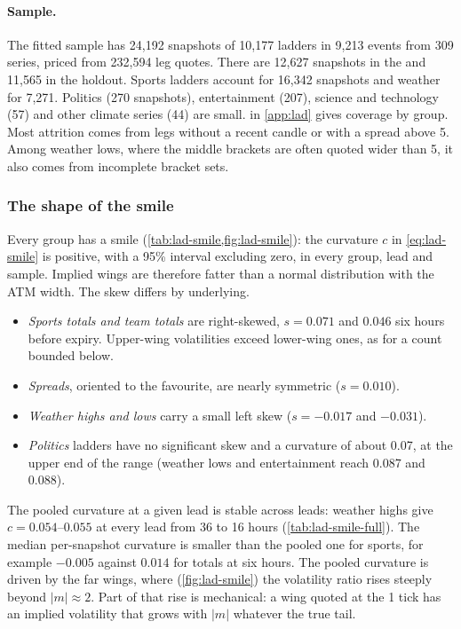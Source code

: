 
\paragraph{Sample.}
The fitted sample has 24,192 snapshots of 10,177 ladders in 9,213 events from 309 series, priced
from 232,594 leg quotes. There are 12,627 snapshots in the \estim{} and 11,565 in the holdout.
Sports ladders account for 16,342 snapshots and weather for 7,271. Politics (270 snapshots),
entertainment (207), science and technology (57) and other climate series (44) are small.
 in \cref{app:lad} gives coverage by group. Most attrition comes from legs
without a recent candle or with a spread above 5\cents. Among weather lows, where the middle
brackets are often quoted wider than 5\cents, it also comes from incomplete bracket sets.

\subsubsection{The shape of the smile}

Every group has a smile (\cref{tab:lad-smile,fig:lad-smile}): the curvature $c$ in
\eqref{eq:lad-smile} is positive, with a 95\% interval excluding zero, in every group, lead and
sample. Implied wings are therefore fatter than a normal distribution with
the ATM width. The skew differs by underlying.
\begin{itemize}
\item \emph{Sports totals and team totals} are right-skewed, $s=0.071$ and $0.046$ six hours
  before expiry. Upper-wing volatilities exceed lower-wing ones, as for a count bounded below.
\item \emph{Spreads}, oriented to the favourite, are nearly symmetric ($s=0.010$).
\item \emph{Weather highs and lows} carry a small left skew ($s=-0.017$ and $-0.031$).
\item \emph{Politics} ladders have no significant skew and a curvature of about 0.07, at the upper
  end of the range (weather lows and entertainment reach 0.087 and 0.088).
\end{itemize}
The pooled curvature at a given lead is stable across leads: weather highs give
$c=0.054$--$0.055$ at every lead from 36 to 16 hours (\cref{tab:lad-smile-full}).
The median per-snapshot curvature is smaller than the pooled one for sports, for example
$-0.005$ against $0.014$ for totals at six hours. The pooled curvature is driven by the far wings,
where (\cref{fig:lad-smile}) the volatility ratio rises steeply beyond $|m|\approx2$. Part of that
rise is mechanical: a wing quoted at the 1\cents{} tick has an implied volatility that grows with
$|m|$ whatever the true tail.


